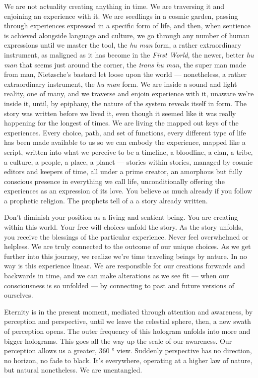 We are not actuality creating anything in time. We are traversing it and
enjoining an experience with it. We are seedlings in a cosmic garden,
passing through experiences expressed in a specific form of life, and
then, when sentience is achieved alongside language and culture, we go
through any number of human expressions until we master the tool, the
\emph{hu man} form, a rather extraordinary instrument, as maligned as it
has become in the \emph{First World}, the newer, better \emph{hu man}
that seems just around the corner, the \emph{trans hu man}, the super
man made from man, Nietzsche's bastard let loose upon the world ---
nonetheless, a rather extraordinary instrument, the \emph{hu man} form.
We are inside a sound and light reality, one of many, and we traverse
and enjoin experience with it, unaware we're inside it, until, by
epiphany, the nature of the system reveals itself in form. The story was
written before we lived it, even though it seemed like it was really
happening for the longest of times. We are living the mapped out keys of
the experiences. Every choice, path, and set of functions, every
different type of life has been made available to us so we can embody
the experience, mapped like a script, written into what we perceive to
be a timeline, a bloodline, a clan, a tribe, a culture, a people, a
place, a planet --- stories within stories, managed by cosmic editors
and keepers of time, all under a prime creator, an amorphous but fully
conscious presence in everything we call life, unconditionally offering
the experiences as an expression of its love. You believe as much
already if you follow a prophetic religion. The prophets tell of a a
story already written.

Don't diminish your position as a living and sentient being. You are
creating within this world. Your free will choices unfold the story. As
the story unfolds, you receive the blessings of the particular
experience. Never feel overwhelmed or helpless. We are truly connected
to the outcome of our unique choices. As we get further into this
journey, we realize we're time traveling beings by nature. In no way is
this experience linear. We are responsible for our creations forwards
and backwards in time, and we can make alterations as we see fit ---
when our consciousness is so unfolded --- by connecting to past and
future versions of ourselves.

Eternity is in the present moment, mediated through attention and
awareness, by perception and perspective, until we leave the celestial
sphere, then, a new swath of perception opens. The outer frequency of
this hologram unfolds into more and bigger holograms. This goes all the
way up the scale of our awareness. Our perception allows us a greater,
360 ° view. Suddenly perspective has no direction, no horizon, no fade
to black. It's everywhere, operating at a higher law of nature, but
natural nonetheless. We are unentangled.

